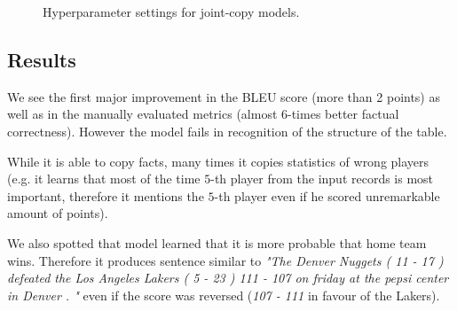 \begin{figure}[h]
    \caption{Hyperparameter settings for joint-copy models.} \label{figure:hyperparameters_copy_low_lr}
\end{figure}

\subsection{Results}

We see the first major improvement in the BLEU score (more than 2 points) as well as in the manually evaluated metrics (almost $6$-times better factual correctness). However the model fails in recognition of the structure of the table.

While it is able to copy facts, many times it copies statistics of wrong players (e.g. it learns that most of the time $5$-th player from the input records is most important, therefore it mentions the $5$-th player even if he scored unremarkable amount of points).

We also spotted that model learned that it is more probable that home team wins. Therefore it produces sentence similar to \emph{"The Denver Nuggets ( 11 - 17 ) defeated the Los Angeles Lakers ( 5 - 23 ) 111 - 107 on friday at the pepsi center in Denver . "} even if the score was reversed (\emph{107 - 111} in favour of the Lakers).

